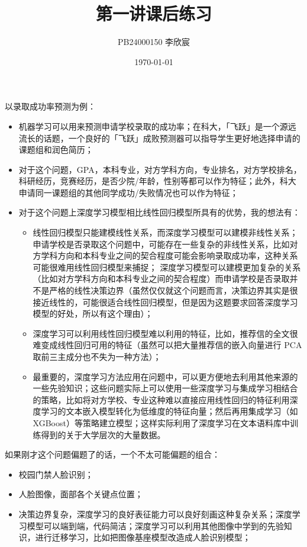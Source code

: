 \documentclass[a4paper]{ctexart}
\title{第一讲课后练习}
\author{PB24000150 李欣宸}
\date{\today}
\begin{document}
\maketitle

以录取成功率预测为例：

\begin{itemize}
    \item 机器学习可以用来预测申请学校录取的成功率；在科大，「飞跃」是一个源远流长的话题，一个良好的「飞跃」成败预测器可以指导学生更好地选择申请的课题组和润色简历；
    \item 对于这个问题，GPA，本科专业，对方学科方向，专业排名，对方学校排名，科研经历，竞赛经历，是否少院/年龄，性别等都可以作为特征；此外，科大申请同一课题组的其他同学成功/失败情况也可以作为特征；
    \item 对于这个问题上深度学习模型相比线性回归模型所具有的优势，我的想法有：
    \begin{itemize}
        \item 线性回归模型只能建模线性关系，而深度学习模型可以建模非线性关系；申请学校是否录取这个问题中，可能存在一些复杂的非线性关系，比如对方学科方向和本科专业之间的契合程度可能会影响录取成功率，这种关系可能很难用线性回归模型来捕捉； 深度学习模型可以建模更加复杂的关系（比如对方学科方向和本科专业之间的契合程度）而申请学校是否录取并不是严格的线性决策边界（虽然仅仅就这个问题而言，决策边界其实是很接近线性的，可能很适合线性回归模型，但是因为这题要求回答深度学习模型的好处，所以有这个理由）；
        \item 深度学习可以利用线性回归模型难以利用的特征，比如，推荐信的全文很难变成线性回归可用的特征（虽然可以把大量推荐信的嵌入向量进行 PCA 取前三主成分也不失为一种方法）；
        \item 最重要的，深度学习方法应用在问题中，可以更方便地去利用其他来源的一些先验知识；这些问题实际上可以使用一些深度学习与集成学习相结合的策略，比如将对方学校、专业这种难以直接应用线性回归的特征利用深度学习的文本嵌入模型转化为低维度的特征向量；然后再用集成学习（如 XGBoost）等策略建立模型；这样实际利用了深度学习在文本语料库中训练得到的关于大学层次的大量数据。
    \end{itemize}
\end{itemize}

如果刚才这个问题偏题了的话，一个不太可能偏题的组合：

\begin{itemize}
    \item 校园门禁人脸识别；
    \item 人脸图像，面部各个关键点位置；
    \item 决策边界复杂，深度学习的良好表征能力可以良好刻画这种复杂关系；深度学习模型可以端到端，代码简洁；深度学习可以利用其他图像中学到的先验知识，进行迁移学习，比如把图像基座模型改造成人脸识别模型；
\end{itemize}
\end{document}
